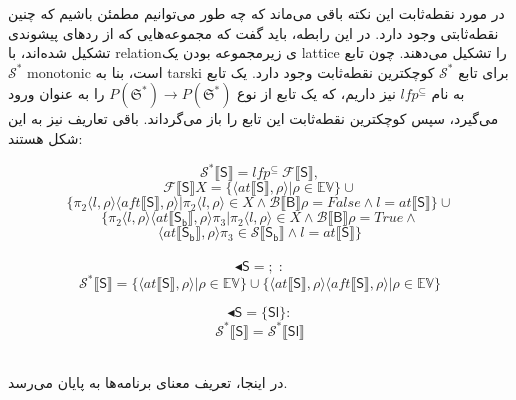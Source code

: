 \begin{defn}
	در مورد نقطه‌ثابت این نکته باقی می‌ماند که چه‌ طور می‌توانیم مطمئن باشیم که چنین نقطه‌ثابتی وجود دارد. در این رابطه، باید گفت که مجموعه‌هایی که از ردهای پیشوندی تشکیل شده‌اند، با \gls*{relation}‌ی زیرمجموعه بودن یک \gls*{lattice} را تشکیل می‌دهند. چون تابع $\mathcal{S}^*$ \gls*{monotonic} است، بنا به \gls{tarski}\cite{tarski} برای تابع $\mathcal{S}^*$ کوچکترین نقطه‌ثابت وجود دارد. یک تابع به نام $lfp^\subseteq$ نیز داریم، که یک تابع از نوع 
	$\mathit{P}(\mathfrak{S^*})\rightarrow\mathit{P}(\mathfrak{S^*})$
	را به‌‌ عنوان ورود می‌گیرد، سپس کوچکترین نقطه‌ثابت این تابع را باز می‌گرداند.
	باقی تعاریف نیز به این شکل هستند:
	
	$$\mathcal{S^*} \llbracket\mathsf{S}\rrbracket = lfp^{\subseteq}\: \mathcal{F\llbracket\mathsf{S}\rrbracket},$$
	 $$\mathcal{F} \llbracket\mathsf{S}\rrbracket X= \{ \langle at\llbracket\mathsf{S}\rrbracket , \rho \rangle | \rho \in \mathbb{EV}       \} \cup $$
	$$  \{ \pi_2 \langle l ,\rho \rangle \langle aft\llbracket\mathsf{S}\rrbracket,\rho \rangle |  \pi_2 \langle l ,\rho \rangle \in X \wedge \mathcal{B}\llbracket\mathsf{B}\rrbracket\rho=False \wedge l= at\llbracket\mathsf{S}\rrbracket   \} \cup      $$
	$$  \{ \pi_2 \langle l ,\rho \rangle \langle at\llbracket\mathsf{S_b}\rrbracket,\rho \rangle \pi_3 |  \pi_2 \langle l ,\rho \rangle \in X \wedge \mathcal{B}\llbracket\mathsf{B}\rrbracket\rho=True \wedge$$$$  \langle at\llbracket\mathsf{S_b}\rrbracket,\rho \rangle \pi_3 \in  \mathcal{S} \llbracket\mathsf{S_b}\rrbracket   \wedge   l= at\llbracket\mathsf{S}\rrbracket  \}  $$\\
	
	$$\blacktriangleleft\mathsf{S} =;  \;:$$
	$$\mathcal{S^*} \llbracket\mathsf{S}\rrbracket = \{ \langle at\llbracket\mathsf{S}\rrbracket , \rho \rangle | \rho \in \mathbb{EV}       \} \cup     \{ \langle at\llbracket\mathsf{S}\rrbracket , \rho \rangle \langle aft\llbracket\mathsf{S}\rrbracket , \rho \rangle | \rho \in \mathbb{EV}       \}             $$  
	
	
	$$\blacktriangleleft\mathsf{S}=\{\mathsf{Sl}\}:$$
	$$\mathcal{S^*} \llbracket\mathsf{S}\rrbracket = \mathcal{S^*} \llbracket\mathsf{Sl}\rrbracket $$   \\
\end{defn}
در اینجا، تعریف معنای برنامه‌ها به پایان می‌رسد.

